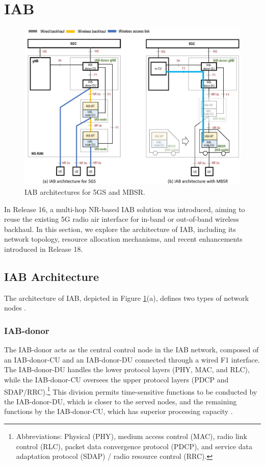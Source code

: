 \documentclass[lettersize,journal]{IEEEtran}
\begin{document}
\section{IAB}

\begin{figure}
\centering
\includegraphics[width=5.5in]{Figs/IAB_architecture.jpg}
\caption{IAB architectures for 5GS and MBSR.}
\label{fig:IAB_architecture}
\end{figure}

In Release 16, a multi-hop NR-based IAB solution was introduced, aiming to reuse the existing 5G radio air interface for in-band or out-of-band wireless backhaul.
In this section, we explore the architecture of IAB, including its network topology, resource allocation mechanisms, and recent enhancements introduced in Release 18.

\subsection{IAB Architecture}

The architecture of IAB, depicted in Figure \ref{fig:IAB_architecture}(a), defines two types of network nodes \cite{TS-38.300}.

\subsubsection{IAB-donor} The IAB-donor acts as the central control node in the IAB network, composed of an IAB-donor-CU and an IAB-donor-DU connected through a wired F1 interface. The IAB-donor-DU handles the lower protocol layers (PHY, MAC, and RLC), while the IAB-donor-CU oversees the upper protocol layers (PDCP and SDAP/RRC).\footnote{Abbreviations: Physical (PHY), medium access control (MAC), radio link control (RLC), packet data convergence protocol (PDCP), and service data adaptation protocol (SDAP) / radio resource control (RRC).} This division permits time-sensitive functions to be conducted by the IAB-donor-DU, which is closer to the served nodes, and the remaining functions by the IAB-donor-CU, which has superior processing capacity \cite{IAB-Overview22,IAB-chae}.
\end{document}

